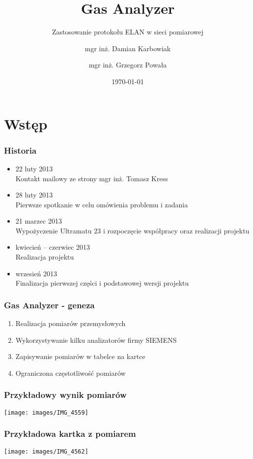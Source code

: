 \documentclass[ucs]{beamer}
\title[Gas Analyzer]{Gas Analyzer}
\subtitle{Zastosowanie protokołu ELAN w sieci pomiarowej}
\author[Karbowiak, Powała]{mgr inż. Damian Karbowiak  \and mgr inż. Grzegorz Powała}
\institute[Politechnika Śląska]{\texttt{[image: images/PolslLogo]} }
\date{\today}
\begin{document}
\begin{frame}
  \titlepage
\end{frame}


\section{Wstęp}
\begin{frame}
\frametitle{Historia}
\begin{itemize}
\setlength{\itemsep}{5pt}
\setlength{\parskip}{5pt}
\setlength{\parsep}{5pt}
\item 22 luty 2013 \\
Kontakt mailowy ze strony mgr inż. Tomasz Kress
\item 28 luty 2013 \\
Pierwsze spotkanie w celu omówienia problemu i zadania
\item 21 marzec 2013 \\
Wypożyczenie Ultramatu 23 i rozpoczęcie współpracy oraz realizacji projektu
\item kwiecień -- czerwiec 2013 \\
Realizacja projektu
\item wrzesień 2013 \\
Finalizacja pierwszej części i podstawowej wersji projektu
\end{itemize}
\end{frame}

\begin{frame}
\frametitle{Gas Analyzer - geneza}
\begin{enumerate}
\setlength{\itemsep}{5pt}
\setlength{\parskip}{5pt}
\setlength{\parsep}{5pt}
\item Realizacja pomiarów przemysłowych
\item Wykorzystywanie kilku analizatorów firmy SIEMENS
\item Zapisywanie pomiarów w tabelce na kartce
\item Ograniczona częstotliwość pomiarów
\end{enumerate}
\end{frame}

\begin{frame}
\frametitle{Przykładowy wynik pomiarów}
\begin{center}
\texttt{[image: images/IMG\_4559]}
\end{center}
\end{frame}

\begin{frame}
\frametitle{Przykładowa kartka z pomiarem}
\begin{center}
\texttt{[image: images/IMG\_4562]}
\end{center}
\end{frame}
\end{document}
